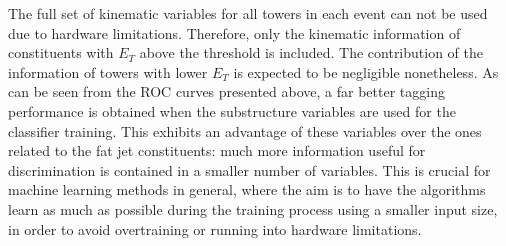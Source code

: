 \documentclass[main]{subfiles} %
\begin{document}
The full set of kinematic variables for all towers in each event can not be used due to hardware limitations. Therefore, only the kinematic information of constituents with $E_T$ above the threshold is included. The contribution of the information of towers with lower $E_T$ is expected to be negligible nonetheless. As can be seen from the ROC curves presented above, a far better tagging performance is obtained when the substructure variables are used for the classifier training. This exhibits an advantage of these variables over the ones related to the fat jet constituents: much more information useful for discrimination is contained in a smaller number of variables. This is crucial for machine learning methods in general, where the aim is to have the algorithms learn as much as possible during the training process using a smaller input size, in order to avoid overtraining or running into hardware limitations. 













\biblio
\end{document}
